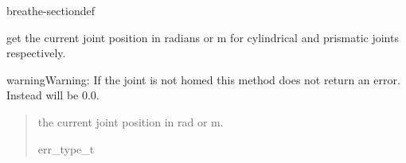 \documentclass[letterpaper,10pt,english]{sphinxmanual}
\begin{document}
\begin{fulllineitems}
\begin{sphinxuseclass}{breathe-sectiondef}
\begin{fulllineitems}
\begin{quote}
\begin{description}
\end{description}\end{quote}

\end{fulllineitems}


\begin{fulllineitems}
\label{\detokenize{code/bioscara_hardware_drivers/index:_CPPv4N25bioscara_hardware_drivers25bioscara_hardware_drivers5Joint11getPositionERf}}\label{\detokenize{code/bioscara_hardware_drivers/index:_CPPv3N25bioscara_hardware_drivers25bioscara_hardware_drivers5Joint11getPositionERf}}\label{\detokenize{code/bioscara_hardware_drivers/index:_CPPv2N25bioscara_hardware_drivers25bioscara_hardware_drivers5Joint11getPositionERf}}\label{\detokenize{code/bioscara_hardware_drivers/index:bioscara_hardware_drivers::bioscara_hardware_drivers::Joint::getPosition__floatR}}
\pysigstartsignatures
\pysigstartmultiline
\pysiglinewithargsret
{\label{\detokenize{code/bioscara_hardware_drivers/index:classbioscara__hardware__drivers_1_1Joint_1aa48673be56b04a573142ee8c9ad18e20}}}
{}
{}
\pysigstopmultiline
\pysigstopsignatures
\sphinxAtStartPar
get the current joint position in radians or m for cylindrical and prismatic joints respectively. 

\begin{sphinxadmonition}{warning}{Warning:}
\sphinxAtStartPar
If the joint is not homed this method does not return an error. Instead  will be 0.0.
\end{sphinxadmonition}
\begin{quote}\begin{description}
\sphinxAtStartPar
{} \textendash{} the current joint position in rad or m. 

\sphinxAtStartPar
err\_type\_t 


\end{description}
\end{quote}
\end{fulllineitems}
\end{sphinxuseclass}
\end{fulllineitems}
\end{document}
